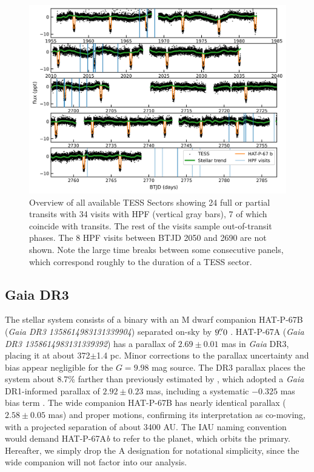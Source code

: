 \documentclass[twocolumn]{aastex631}
\begin{document}
\begin{figure}
    \centering
    \includegraphics[width=0.98\linewidth]{figures/TESS_HAT-P-67b_overview.png}
    \caption{Overview of all available TESS Sectors showing 24 full or partial transits with 34 visits with HPF (vertical gray bars), 7 of which coincide with transits.  The rest of the visits sample out-of-transit phases.  The 8 HPF visits between BTJD 2050 and 2690 are not shown.  Note the large time breaks between some consecutive panels, which correspond roughly to the duration of a TESS sector.}
    \label{fig:TESSoverview}
\end{figure}

\subsection{Gaia DR3}\label{gaiadr3}
The stellar system consists of a binary with an M dwarf companion HAT-P-67B (\emph{Gaia DR3 1358614983131339904}) separated on-sky by $9\mbox{$.\!\!^{\prime\prime}$}0$ \citep{2019MNRAS.490.5088M}.  HAT-P-67A (\emph{Gaia DR3 1358614983131339392}) has a parallax of $2.69\pm0.01$ mas in \emph{Gaia} DR3, placing it at about 372$\pm$1.4 pc.  Minor corrections to the parallax uncertainty \citep{2021MNRAS.506.2269E} and bias \citep{2021A&A...649A...4L} appear negligible for the $G=9.98$ mag source.  The DR3 parallax places the system about 8.7\% farther than previously estimated by \citet{2017AJ....153..211Z}, which adopted a \emph{Gaia} DR1-informed parallax of $2.92\pm0.23$ mas, including a systematic $-0.325$ mas bias term \citep{2016ApJ...831L...6S}.  The wide companion HAT-P-67B has nearly identical parallax ($2.58\pm0.05$ mas) and proper motions, confirming its interpretation as co-moving, with a projected separation of about 3400 AU.  The IAU naming convention would demand HAT-P-67A\emph{b} to refer to the planet, which orbits the primary.  Hereafter, we simply drop the A designation for notational simplicity, since the wide companion will not factor into our analysis.
\end{document}
